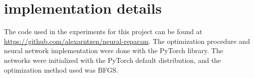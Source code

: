 \appendix
\section{implementation details}
\label{sec:appendix}
The code used in the experiments for this project can be found at \url{https://github.com/alexarntzen/neural-reparam}. The optimization procedure and neural network implementation were done with the PyTorch \cite{PyTorch} library. The networks were initialized with the PyTorch default distribution, and the optimization method used was BFGS.

